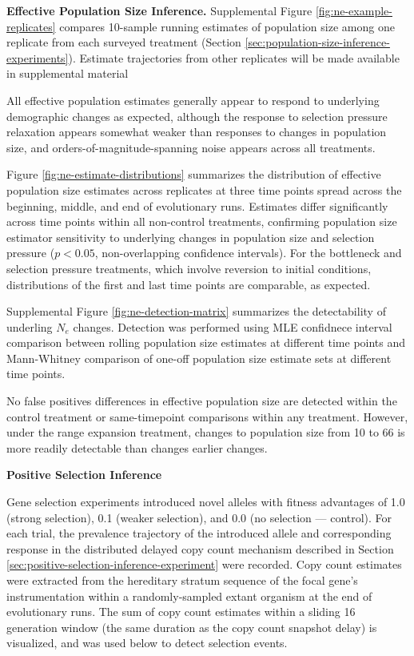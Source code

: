 \textbf{Effective Population Size Inference.}
Supplemental Figure \ref{fig:ne-example-replicates} compares 10-sample running estimates of population size among one replicate from each surveyed treatment (Section \ref{sec:population-size-inference-experiments}).
Estimate trajectories from other replicates will be made available in supplemental material

All effective population estimates generally appear to respond to underlying demographic changes as expected, although the response to selection pressure relaxation appears somewhat weaker than responses to changes in population size, and orders-of-magnitude-spanning noise appears across all treatments.



Figure \ref{fig:ne-estimate-distributions} summarizes the distribution of effective population size estimates across replicates at three time points spread across the beginning, middle, and end of evolutionary runs.
Estimates differ significantly across time points within all non-control treatments, confirming population size estimator sensitivity to underlying changes in population size and selection pressure ($p < 0.05$, non-overlapping confidence intervals).
For the bottleneck and selection pressure treatments, which involve reversion to initial conditions, distributions of the first and last time points are comparable, as expected.

Supplemental Figure \ref{fig:ne-detection-matrix} summarizes the detectability of underling $N_e$ changes.
Detection was performed using MLE confidnece interval comparison between rolling population size estimates at different time points and Mann-Whitney comparison of one-off population size estimate sets at different time points.

No false positives differences in effective population size are detected within the control treatment or same-timepoint comparisons within any treatment.
However, under the range expansion treatment, changes to population size from 10 to 66 is more readily detectable than changes earlier changes.


\textbf{Positive Selection Inference}

Gene selection experiments introduced novel alleles with fitness advantages of 1.0 (strong selection), 0.1 (weaker selection), and 0.0 (no selection --- control).
For each trial, the prevalence trajectory of the introduced allele and corresponding response in the distributed delayed copy count mechanism described in Section \ref{sec:positive-selection-inference-experiment} were recorded.
Copy count estimates were extracted from the hereditary stratum sequence of the focal gene's instrumentation within a randomly-sampled extant organism at the end of evolutionary runs.
The sum of copy count estimates within a sliding 16 generation window (the same duration as the copy count snapshot delay) is visualized, and was used below to detect selection events.

